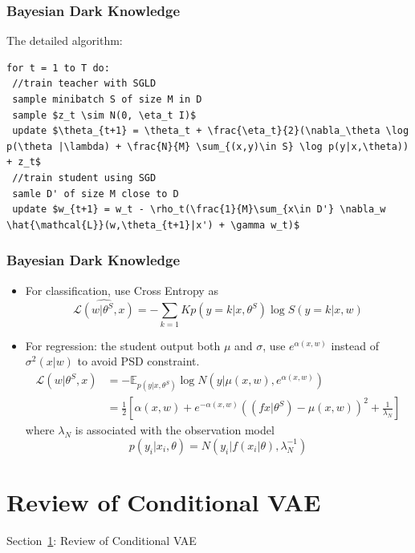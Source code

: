 \documentclass{beamer}
\begin{document}
\begin{frame}[fragile]
\frametitle{Bayesian Dark Knowledge}
The detailed algorithm:
\begin{lstlisting}[mathescape=true]
for t = 1 to T do:
 //train teacher with SGLD
 sample minibatch S of size M in D
 sample $z_t \sim N(0, \eta_t I)$
 update $\theta_{t+1} = \theta_t + \frac{\eta_t}{2}(\nabla_\theta \log p(\theta |\lambda) + \frac{N}{M} \sum_{(x,y)\in S} \log p(y|x,\theta)) + z_t$
 //train student using SGD
 samle D' of size M close to D
 update $w_{t+1} = w_t - \rho_t(\frac{1}{M}\sum_{x\in D'} \nabla_w \hat{\mathcal{L}}(w,\theta_{t+1}|x') + \gamma w_t)$
\end{lstlisting}

\end{frame}

\begin{frame}
\frametitle{Bayesian Dark Knowledge}
\begin{itemize}
\item For classification, use Cross Entropy as 
\[
\hat{\mathcal{L}(w|\theta^S, x)} = -\sum_{k=1}{K} p(y=k|x,\theta^S) \log S(y=k|x,w)
\]
\item For regression: the student output both $\mu$ and $\sigma$, use $e^{\alpha(x,w)}$ instead of $\sigma^2(x|w)$ to avoid PSD constraint.
\[
\begin{split}
\hat{\mathcal{L}}(w|\theta^S,x) &= -\mathbb{E}_{p(y|x, \theta^S)} \log N(y|\mu(x,w), e^{\alpha(x,w)}) \\
&= \frac{1}{2}[\alpha(x,w) + e^{-\alpha(x,w)}((fx|\theta^S)-\mu(x,w))^2 + \frac{1}{\lambda_N}]
\end{split}
\]
where $\lambda_N$ is associated with the observation model
\[
p(y_i|x_i,\theta) = N(y_i|f(x_i|\theta), \lambda_N^{-1})
\]
\end{itemize}

\end{frame}

\section{Review of Conditional VAE}
\label{sec-cvae}
\begin{frame}
\centerline{Section~\ref{sec-cvae}: Review of Conditional VAE}
\end{frame}
\end{document}
